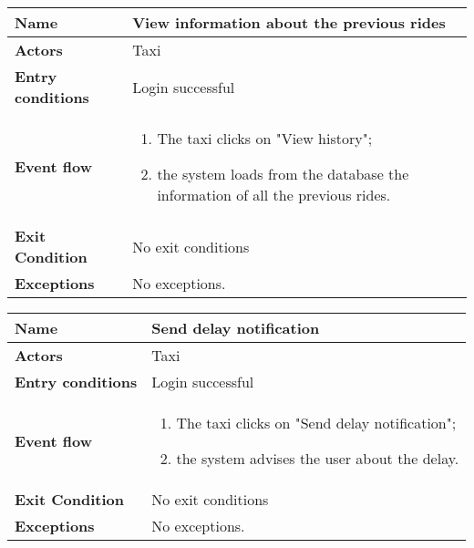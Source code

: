 \vspace{20pt}
\noindent
\begin{tabular}{l l}
 \textbf {Name} & View information about the previous rides  \\ \hline
 \textbf{Actors} & Taxi \\ \hline
 \textbf{Entry conditions} & Login successful \\ \hline
 \textbf{Event flow} & 
 \parbox{0.9\textwidth}{
 \begin{enumerate}
 \item The taxi clicks on "View history";
 \item the system loads from the database the information of all the previous rides.
 \end{enumerate}
 } \\ \hline
 \textbf{Exit Condition} & No exit conditions \\ \hline
 \textbf{Exceptions} & No exceptions.
\end{tabular}

\vspace{20pt}
\noindent
\begin{tabular}{l l}
 \textbf {Name} & Send delay notification  \\ \hline
 \textbf{Actors} & Taxi \\ \hline
 \textbf{Entry conditions} & Login successful \\ \hline
 \textbf{Event flow} & 
 \parbox{0.9\textwidth}{
 \begin{enumerate}
 \item The taxi clicks on "Send delay notification";
 \item the system advises the user about the delay.
 \end{enumerate}
 } \\ \hline
 \textbf{Exit Condition} & No exit conditions \\ \hline
 \textbf{Exceptions} & No exceptions.
\end{tabular}


